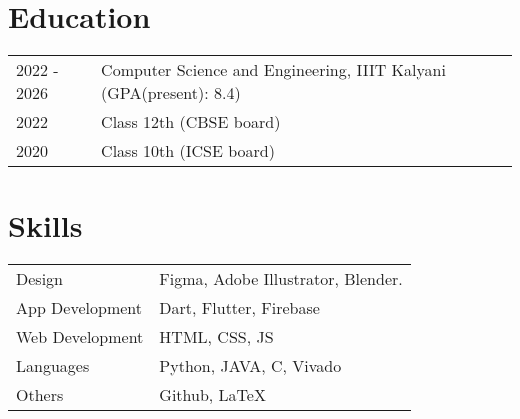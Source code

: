 \documentclass{article}
\begin{document}
\section{Education}
\begin{tabularx}{\linewidth}{@{}l X@{}}	
2022 - 2026 & Computer Science and Engineering, IIIT Kalyani \hfill \normalsize (GPA(present): 8.4) \\
2022 & Class 12th (CBSE board) \\
2020 & Class 10th (ICSE board)\\
\end{tabularx}

\section{Skills}
\begin{tabularx}{\linewidth}{@{}l X@{}}
Design &  \normalsize{Figma, Adobe Illustrator, Blender.}\\
App Development  &  \normalsize{Dart, Flutter, Firebase}\\
Web Development  &  \normalsize{HTML, CSS, JS}\\  
Languages  &  \normalsize{Python, JAVA, C, Vivado}\\
Others &  \normalsize{Github, LaTeX}
\end{tabularx}

\vfill
{}
\end{document}
